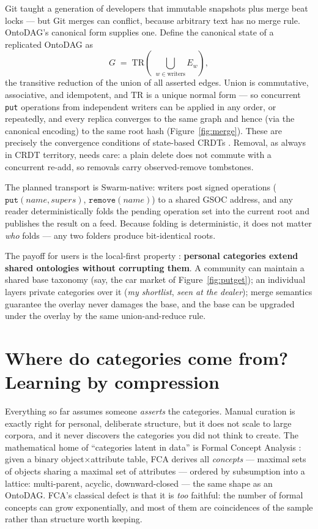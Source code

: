 \documentclass[10pt,twocolumn]{article}
\begin{document}
Git taught a generation of developers that immutable snapshots plus merge
beat locks --- but Git merges can conflict, because arbitrary text has no
merge rule. OntoDAG's canonical form supplies one. Define the canonical
state of a replicated OntoDAG as
\[
  G \;=\; \mathrm{TR}\!\left(\;\bigcup_{w \in \text{writers}} E_w\right),
\]
the transitive reduction of the union of all asserted edges. Union is
commutative, associative, and idempotent, and $\mathrm{TR}$ is a unique
normal form \cite{aho1972} --- so concurrent \texttt{put} operations from
independent writers can be applied in any order, or repeatedly, and every
replica converges to the same graph and hence (via the canonical encoding)
to the same root hash (Figure~\ref{fig:merge}). These are precisely the
convergence conditions of state-based CRDTs \cite{shapiro2011}. Removal,
as always in CRDT territory, needs care: a plain delete does not commute
with a concurrent re-add, so removals carry observed-remove tombstones.

The planned transport is Swarm-native: writers post signed operations
($\texttt{put}(name, supers)$, $\texttt{remove}(name)$) to a shared GSOC
address, and any reader deterministically folds the pending operation set
into the current root and publishes the result on a feed. Because folding
is deterministic, it does not matter \emph{who} folds --- any two folders
produce bit-identical roots.

The payoff for users is the local-first property \cite{kleppmann2019}:
\textbf{personal categories extend shared ontologies without corrupting
them}. A community can maintain a shared base taxonomy (say, the car
market of Figure~\ref{fig:putget}); an individual layers private
categories over it (\emph{my shortlist}, \emph{seen at the dealer});
merge semantics guarantee the overlay never damages the base, and the
base can be upgraded under the overlay by the same union-and-reduce rule.

\section{Where do categories come from? Learning by compression}
\label{sec:mdl}

Everything so far assumes someone \emph{asserts} the categories. Manual
curation is exactly right for personal, deliberate structure, but it does
not scale to large corpora, and it never discovers the categories you did
not think to create. The mathematical home of ``categories latent in
data'' is Formal Concept Analysis \cite{wille1982,ganter1999}: given a
binary object$\times$attribute table, FCA derives all \emph{concepts} ---
maximal sets of objects sharing a maximal set of attributes --- ordered by
subsumption into a lattice: multi-parent, acyclic, downward-closed --- the
same shape as an OntoDAG. FCA's classical defect is that it is
\emph{too} faithful: the number of formal concepts can grow exponentially,
and most of them are coincidences of the sample rather than structure
worth keeping.
\end{document}
